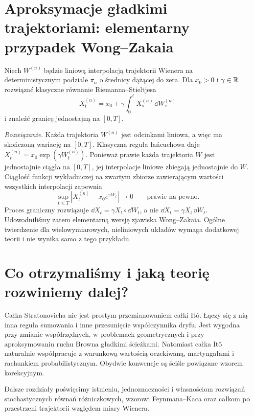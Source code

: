 \section{Aproksymacje gładkimi trajektoriami: elementarny przypadek Wong--Zakaia}
\begin{zadanie}
Niech $W^{(n)}$ będzie liniową interpolacją
trajektorii Wienera na deterministycznym podziale
$\pi_n$ o średnicy dążącej do zera. Dla $x_0>0$
i $\gamma\in\mathbb{R}$ rozwiązać klasyczne równanie
Riemanna--Stieltjesa
\[
X_t^{(n)}=x_0+\gamma\int_0^t
X_s^{(n)}\,\dd W_s^{(n)}
\]
i znaleźć granicę jednostajną na $[0,T]$.

\emph{Rozwiązanie.} Każda trajektoria $W^{(n)}$
jest odcinkami liniowa, a więc ma skończoną wariację
na $[0,T]$. Klasyczna reguła łańcuchowa daje
$X_t^{(n)}=x_0\exp(\gamma W_t^{(n)})$.
Ponieważ prawie każda trajektoria $W$ jest
jednostajnie ciągła na $[0,T]$, jej interpolacje
liniowe zbiegają jednostajnie do $W$. Ciągłość
funkcji wykładniczej na zwartym zbiorze zawierającym
wartości wszystkich interpolacji zapewnia
\[
\sup_{t\le T}|X_t^{(n)}-x_0e^{\gamma W_t}|
\longrightarrow0\qquad\text{prawie na pewno}.
\]
Proces graniczny rozwiązuje
$\dd X_t=\gamma X_t\circ\dd W_t$,
a nie $\dd X_t=\gamma X_t\,\dd W_t$.
Udowodniliśmy zatem elementarną wersję zjawiska
Wong--Zakaia. Ogólne twierdzenie dla wielowymiarowych,
nieliniowych układów wymaga dodatkowej teorii i
nie wynika samo z tego przykładu.
\end{zadanie}

\section{Co otrzymaliśmy i jaką teorię rozwiniemy dalej?}
Całka Stratonovicha nie jest prostym przemianowaniem
całki Itô. Łączy się z nią inna reguła sumowania i
inne przesunięcie współczynnika dryfu. Jest wygodna
przy zmianie współrzędnych, w problemach geometrycznych
i przy aproksymowaniu ruchu Browna gładkimi ścieżkami.
Natomiast całka Itô naturalnie współpracuje z
warunkową wartością oczekiwaną, martyngałami i
rachunkiem probabilistycznym. Obydwie konwencje są
ściśle powiązane wzorem korekcyjnym.

Dalsze rozdziały poświęcimy istnieniu, jednoznaczności
i własnościom rozwiązań stochastycznych równań
różniczkowych, wzorowi Feynmana--Kaca oraz całkom
po przestrzeni trajektorii względem miary Wienera.


